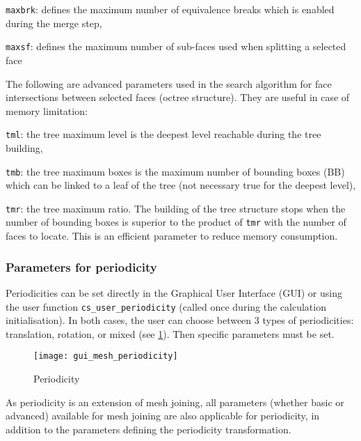 {{{\begin{list}{-}{}
\item \texttt{maxbrk}: defines the maximum number of equivalence breaks which is enabled during the merge step,
\item \texttt{maxsf}: defines the maximum number of sub-faces used when splitting a selected face
\end{list}
%
The following are advanced parameters used in the search algorithm for face intersections between selected faces (octree structure). They are useful in case of memory limitation:
\begin{list}{-}{}
\item \texttt{tml}: the tree maximum level is the deepest level reachable during the tree building,
\item \texttt{tmb}: the tree maximum boxes is the maximum number of bounding boxes (BB) which can be linked to a leaf of the tree (not necessary true for the deepest level),
\item \texttt{tmr}: the tree maximum ratio. The building of the tree structure stops when the number of bounding boxes is superior to the product of \texttt{tmr} with the number of faces to locate. This is an efficient parameter to reduce memory consumption.
\end{list}

\subsubsection{Parameters for periodicity}

Periodicities can be set directly in the Graphical User Interface (GUI) or using the user function \texttt{cs\_user\_periodicity} (called once during the calculation initialisation). In both cases, the user can choose between 3 types of periodicities: translation, rotation, or mixed 
(see \figurename\ref{fig:periodicities}).
Then specific parameters must be set.

\begin{figure}[!h]
\begin{center}
\texttt{[image: gui\_mesh\_periodicity]}
\caption{Periodicity}
\label{fig:periodicities}
\end{center}
\end{figure}

As periodicity is an extension of mesh joining, all parameters (whether basic or advanced) available for mesh joining are also applicable for periodicity, in addition to the parameters defining the periodicity transformation.

}}}
